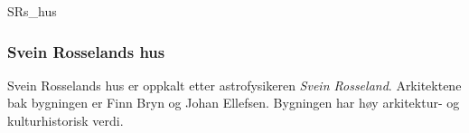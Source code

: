 \begin{uioimageframe}[info={© Universitetet i Oslo}]{SRs_hus}
  \frametitle{Svein Rosselands hus}

  Svein Rosselands hus er oppkalt etter astrofysikeren \emph{Svein
  Rosseland}. Arkitektene bak bygningen er Finn Bryn og Johan
  Ellefsen. Bygningen har høy arkitektur- og kulturhistorisk verdi.
\end{uioimageframe}
